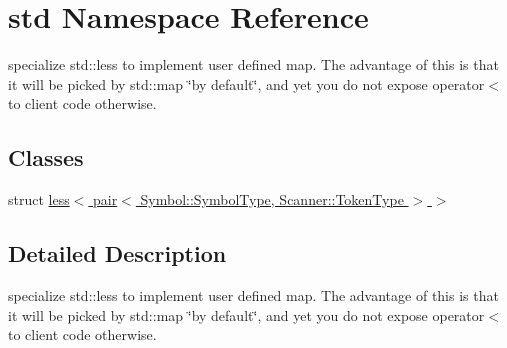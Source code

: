 \hypertarget{namespacestd}{}\section{std Namespace Reference}
\label{namespacestd}


specialize std\+::less to implement user defined map. The advantage of this is that it will be picked by std\+::map \char`\"{}by default\char`\"{}, and yet you do not expose operator$<$ to client code otherwise.  


\subsection*{Classes}
\begin{DoxyCompactItemize}
\item 
struct \hyperlink{structstd_1_1less_3_01pair_3_01_symbol_1_1_symbol_type_00_01_scanner_1_1_token_type_01_4_01_4}{less$<$ pair$<$ Symbol\+::\+Symbol\+Type, Scanner\+::\+Token\+Type $>$ $>$}
\end{DoxyCompactItemize}


\subsection{Detailed Description}
specialize std\+::less to implement user defined map. The advantage of this is that it will be picked by std\+::map \char`\"{}by default\char`\"{}, and yet you do not expose operator$<$ to client code otherwise. 